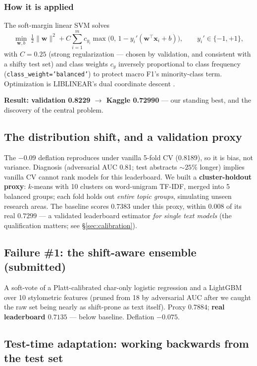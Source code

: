 \documentclass[11pt,a4paper]{article}
\begin{document}
\subsubsection{How it is applied}
The soft-margin linear SVM solves
\begin{equation}
\min_{\mathbf{w},b} \; \tfrac{1}{2}\|\mathbf{w}\|^2 + C \sum_{i=1}^m c_{y_i} \max\big(0,\, 1 - y_i'(\mathbf{w}^\top\mathbf{x}_i + b)\big), \qquad y_i' \in \{-1,+1\},
\end{equation}
with $C = 0.25$ (strong regularization --- chosen by validation, and consistent with a shifty test set) and class weights $c_{y}$ inversely proportional to class frequency (\texttt{class\_weight='balanced'}) to protect macro F1's minority-class term. Optimization is LIBLINEAR's dual coordinate descent \cite{fan2008}.

\textbf{Result: validation 0.8229 $\to$ Kaggle 0.72990} --- our standing best, and the discovery of the central problem.

\subsection{The distribution shift, and a validation proxy}\label{sec:shift}
The $-0.09$ deflation reproduces under vanilla 5-fold CV (0.8189), so it is bias, not variance. Diagnosis (adversarial AUC 0.81; test abstracts ${\sim}25\%$ longer) implies vanilla CV cannot rank models for this leaderboard. We built a \textbf{cluster-holdout proxy}: $k$-means \cite{macqueen1967} with 10 clusters on word-unigram TF-IDF, merged into 5 balanced groups; each fold holds out \emph{entire topic groups}, simulating unseen research areas. The baseline scores $0.7383$ under this proxy, within $0.008$ of its real $0.7299$ --- a validated leaderboard estimator \emph{for single text models} (the qualification matters; see \S\ref{sec:calibration}).

\subsection{Failure \#1: the shift-aware ensemble (submitted)}
A soft-vote of a Platt-calibrated \cite{platt1999} char-only logistic regression and a LightGBM over 10 stylometric features (pruned from 18 by adversarial AUC after we caught the raw set being nearly as shift-prone as text itself). Proxy $0.7884$; \textbf{real leaderboard $0.7135$} --- below baseline. Deflation $-0.075$.

\subsection{Test-time adaptation: working backwards from the test set}\label{sec:adapt}
\end{document}
